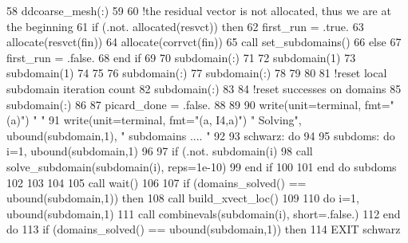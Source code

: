 \begin{DoxyCode}
58         ddcoarse_mesh(:)%
59         
60         \textcolor{comment}{!the residual vector is not allocated, thus we are at the beginning}
61         \textcolor{keywordflow}{if} (.not. \textcolor{keyword}{allocated}(resvct)) \textcolor{keywordflow}{then}
62           first\_run = .true.
63           \textcolor{keyword}{allocate}(resvct(fin))
64           \textcolor{keyword}{allocate}(corrvct(fin))          
65           \textcolor{keyword}{call }set_subdomains()
66         \textcolor{keywordflow}{else}
67           first\_run = .false.
68 \textcolor{keywordflow}{        end if}
69 
70         subdomain(:)%
71         
72         subdomain(1)%
73         subdomain(1)%
74         
75         
76         subdomain(:)%
77         subdomain(:)%
78         
79               
80                 
81         \textcolor{comment}{!reset local subdomain iteration count}
82         subdomain(:)%
83 
84         \textcolor{comment}{!reset successes on domains}
85         subdomain(:)%
86         
87         picard\_done = .false.
88         
89 
90         \textcolor{keyword}{write}(unit=terminal, fmt=\textcolor{stringliteral}{"(a)"}) \textcolor{stringliteral}{"  "}
91         \textcolor{keyword}{write}(unit=terminal, fmt=\textcolor{stringliteral}{"(a, I4,a)"}) \textcolor{stringliteral}{" Solving"}, ubound(subdomain,1),  \textcolor{stringliteral}{" subdomains .... "}
92         
93         schwarz: \textcolor{keywordflow}{do}
94 
95           subdoms:  \textcolor{keywordflow}{do} i=1, ubound(subdomain,1)
96          
97             \textcolor{keywordflow}{if} (.not. subdomain(i)%
98               \textcolor{keyword}{call }solve_subdomain(subdomain(i), reps=1e-10)
99 \textcolor{keywordflow}{            end if}
100             
101 \textcolor{keywordflow}{          end do} subdoms
102          
103 
104           
105           \textcolor{keyword}{call }wait()
106           
107           \textcolor{keywordflow}{if} (domains_solved() == ubound(subdomain,1)) \textcolor{keywordflow}{then}
108             \textcolor{keyword}{call }build_xvect_loc()
109             
110             \textcolor{keywordflow}{do} i=1, ubound(subdomain,1)
111               \textcolor{keyword}{call }combinevals(subdomain(i), short=.false.)
112 \textcolor{keywordflow}{            end do}
113             \textcolor{keywordflow}{if} (domains_solved() == ubound(subdomain,1)) \textcolor{keywordflow}{then}
114               \textcolor{keywordflow}{EXIT} schwarz

\end{DoxyCode}
